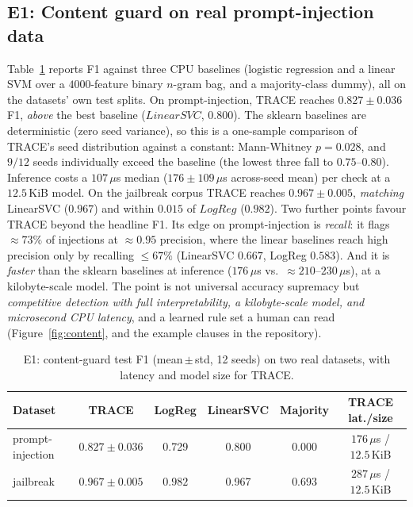 \documentclass[11pt]{article}
\newcommand{\piTrace}{0.827}\newcommand{\piTraceSd}{0.036}
\newcommand{\piBest}{0.800}\newcommand{\piBestName}{LinearSVC}\newcommand{\piP}{0.028}
\newcommand{\piLat}{176}\newcommand{\piSize}{12.5}
\newcommand{\jbTrace}{0.967}\newcommand{\jbTraceSd}{0.005}
\newcommand{\jbBest}{0.982}\newcommand{\jbBestName}{LogReg}
\newcommand{\jbLat}{287}
\newcommand{\latMed}{107}\newcommand{\latPNN}{428}\newcommand{\latStd}{109}
\begin{document}
\subsection{E1: Content guard on real prompt-injection data}

Table~\ref{tab:content} reports F1 against three CPU baselines (logistic
regression and a linear SVM over a $4000$-feature binary $n$-gram bag, and a
majority-class dummy), all on the datasets' own test splits. On
prompt-injection, TRACE reaches $\piTrace\pm\piTraceSd$ F1, \emph{above} the best
baseline ($\piBestName$, $\piBest$). The sklearn baselines are deterministic
(zero seed variance), so this is a one-sample comparison of TRACE's seed
distribution against a constant: Mann-Whitney $p=\piP$, and $9/12$ seeds
individually exceed the baseline (the lowest three fall to $0.75$--$0.80$).
Inference costs a $\latMed\,\mu$s median ($\piLat\pm\latStd\,\mu$s across-seed
mean) per check at a $\piSize$\,KiB model. On the jailbreak corpus TRACE reaches
$\jbTrace\pm\jbTraceSd$, \emph{matching} LinearSVC ($0.967$) and within $0.015$
of $\jbBestName$ ($\jbBest$). Two further points favour TRACE beyond the headline
F1. Its edge on prompt-injection is \emph{recall}: it flags $\approx\!73\%$ of
injections at $\approx\!0.95$ precision, where the linear baselines reach high
precision only by recalling $\le\!67\%$ (LinearSVC $0.667$, LogReg $0.583$). And
it is \emph{faster} than the sklearn baselines at inference ($\piLat\,\mu$s vs.\
$\approx\!210$--$230\,\mu$s), at a kilobyte-scale model. The point is not
universal accuracy supremacy but \emph{competitive detection with full
interpretability, a kilobyte-scale model, and microsecond CPU latency}, and a
learned rule set a human can read (Figure~\ref{fig:content}, and the example
clauses in the repository).

\begin{table}[t]\centering\small
\caption{E1: content-guard test F1 (mean\,$\pm$\,std, 12 seeds) on two real
datasets, with latency and model size for TRACE.}
\label{tab:content}
\begin{tabular}{lccccc}
\toprule
Dataset & TRACE & LogReg & LinearSVC & Majority & TRACE lat./size \\
\midrule
prompt-injection & $\mathbf{\piTrace \pm \piTraceSd}$ & 0.729 & \piBest & 0.000 & $\piLat\,\mu$s / $\piSize$\,KiB \\
jailbreak & $\jbTrace \pm \jbTraceSd$ & $\mathbf{\jbBest}$ & 0.967 & 0.693 & $\jbLat\,\mu$s / $\piSize$\,KiB \\
\bottomrule
\end{tabular}
\end{table}
\end{document}
